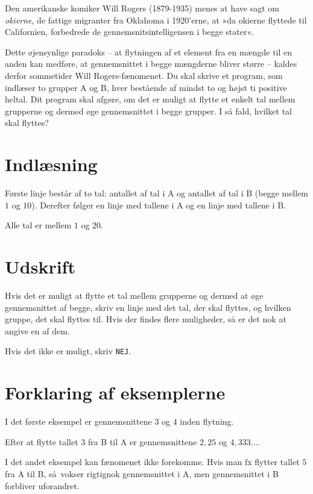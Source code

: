 Den amerikanske komiker Will Rogers (1879-1935) menes at have sagt om \emph{okierne}, de fattige migranter fra Oklahoma i 1920'erne, at »da okierne  flyttede til Californien, forbedrede de gennemsnitsintelligensen i begge stater«.

Dette øjensynlige paradoks -- at flytningen af et element fra en mængde til en anden kan medføre, at gennemsnittet i begge mængderne bliver større -- kaldes derfor sommetider Will Rogers-fænomenet.
Du skal skrive et program, som indlæser to grupper A og B, hver bestående af mindst to og højst ti positive heltal.
Dit program skal afgøre, om det er muligt at flytte et enkelt tal mellem grupperne og dermed øge gennemsnittet i begge grupper.
I så fald, hvilket tal skal flyttes?

\section*{Indlæsning}

Første linje består af to tal: antallet af tal i A og antallet af tal i B (begge mellem $1$ og $10$).
Derefter følger en linje med tallene i A og en linje med tallene i B.

Alle tal er mellem $1$ og $20$.

\section*{Udskrift}
Hvis det er muligt at flytte et tal mellem grupperne og dermed at øge gennemsnittet af begge, skriv en linje med det tal, der skal flyttes, og hvilken gruppe, det skal flyttes til.
Hvis der findes flere muligheder, så er det nok at angive en af dem.

Hvis det ikke er muligt, skriv \texttt{NEJ}.

\section*{Forklaring af eksemplerne}

I det første eksempel er gennemsnittene $3$ og $4$ inden flytning.

Efter at flytte tallet $3$ fra B til A er gennemsnittene $2{,}25$ og $4{,}333\ldots$.

I det andet eksempel kan fænomenet ikke forekomme.
Hvis man fx flytter tallet $5$ fra A til B, så vokser rigtignok gennemsnittet i A, men gennemsnittet i B forbliver uforandret. 
